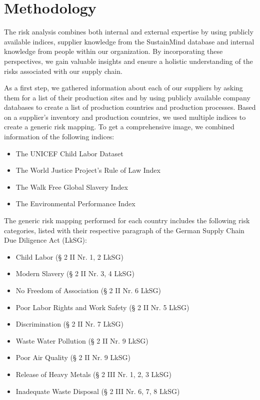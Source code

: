 \documentclass{article}
\begin{document}
\section{Methodology}

The risk analysis combines both internal and external expertise by using publicly available indices, supplier knowledge from the SustainMind database and internal
knowledge from people within our organization. By incorporating these perspectives, we gain valuable insights and ensure a holistic understanding of the risks
associated with our supply chain.

As a first step, we gathered information about each of our suppliers by asking them for a list of their production sites and by using publicly available company databases
to create a list of production countries and production processes. Based on a supplier's inventory and production countries, we used multiple indices to
create a generic risk mapping. To get a comprehensive image, we combined information of the following indices:

\begin{itemize}
    \item The UNICEF Child Labor Dataset
    \item The World Justice Project's Rule of Law Index
    \item The Walk Free Global Slavery Index
    \item The Environmental Performance Index
\end{itemize}

The generic risk mapping performed for each country includes the following risk categories, listed with their respective paragraph of the German Supply Chain Due Diligence Act (LkSG):
\begin{itemize}
    \item Child Labor (§ 2 II Nr. 1, 2 LkSG)
    \item Modern Slavery (§ 2 II Nr. 3, 4 LkSG)
    \item No Freedom of Association (§ 2 II Nr. 6 LkSG)
    \item Poor Labor Rights and Work Safety (§ 2 II Nr. 5 LkSG)
    \item Discrimination (§ 2 II Nr. 7 LkSG)
    \item Waste Water Pollution (§ 2 II Nr. 9 LkSG)
    \item Poor Air Quality (§ 2 II Nr. 9 LkSG)
    \item Release of Heavy Metals (§ 2 III Nr. 1, 2, 3 LkSG)
    \item Inadequate Waste Disposal (§ 2 III Nr. 6, 7, 8 LkSG)
\end{itemize}
\end{document}
